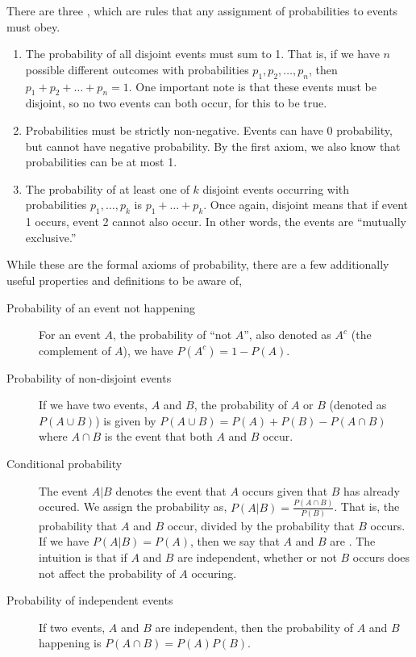 There are three , which are rules that any assignment of probabilities to events must obey.

\begin{enumerate}
    \item The probability of all disjoint events must sum to 1. That is, if we have $n$ possible different outcomes with probabilities $p_1, p_2, \dots, p_n$, then $p_1 + p_2 + \dots + p_n = 1$. One important note is that these events must be disjoint, so no two events can both occur, for this to be true.
    \item Probabilities must be strictly non-negative. Events can have $0$ probability, but cannot have negative probability. By the first axiom, we also know that probabilities can be at most 1.
    \item The probability of at least one of $k$ disjoint events occurring with probabilities $p_1, \dots, p_k$ is $p_1 + \dots + p_k$. Once again, disjoint means that if event 1 occurs, event 2 cannot also occur. In other words, the events are ``mutually exclusive.''
\end{enumerate}

While these are the formal axioms of probability, there are a few additionally useful properties and definitions to be aware of,
\begin{description}
    \item[Probability of an event not happening] For an event $A$, the probability of ``not $A$'', also denoted as $A^c$ (the complement of $A$), we have $P(A^c) = 1 - P(A)$.
    \item[Probability of non-disjoint events] If we have two events, $A$ and $B$, the probability of $A$ or $B$ (denoted as $P(A \cup B)$) is given by $P(A \cup B) = P(A) + P(B) - P(A \cap B)$ where $A \cap B$ is the event that both $A$ and $B$ occur.  
    \item[Conditional probability] The event $A | B$ denotes the event that $A$ occurs given that $B$ has already occured. We assign the probability as, $P(A | B) = \frac{P(A \cap B)}{P(B)}$. That is, the probability that $A$ and $B$ occur, divided by the probability that $B$ occurs. If we have $P(A | B) = P(A)$, then we say that $A$ and $B$ are . The intuition is that if $A$ and $B$ are independent, whether or not $B$ occurs does not affect the probability of $A$ occuring. 
    \item[Probability of independent events] If two events, $A$ and $B$ are independent, then the probability of $A$ and $B$ happening is $P(A \cap B) = P(A) P(B)$. 
\end{description}

